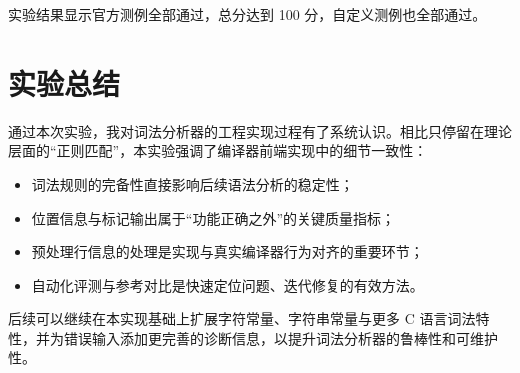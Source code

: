 \documentclass[UTF8,a4paper,12pt]{ctexart}
\begin{document}
实验结果显示官方测例全部通过，总分达到 100 分，自定义测例也全部通过。

\section{实验总结}
通过本次实验，我对词法分析器的工程实现过程有了系统认识。相比只停留在理论层面的“正则匹配”，本实验强调了编译器前端实现中的细节一致性：
\begin{itemize}
  \item 词法规则的完备性直接影响后续语法分析的稳定性；
  \item 位置信息与标记输出属于“功能正确之外”的关键质量指标；
  \item 预处理行信息的处理是实现与真实编译器行为对齐的重要环节；
  \item 自动化评测与参考对比是快速定位问题、迭代修复的有效方法。
\end{itemize}

后续可以继续在本实现基础上扩展字符常量、字符串常量与更多 C 语言词法特性，并为错误输入添加更完善的诊断信息，以提升词法分析器的鲁棒性和可维护性。
\end{document}
